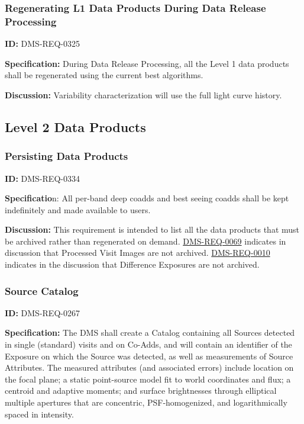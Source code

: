 \documentclass[SE,toc,lsstdraft]{lsstdoc}
\begin{document}
\subsubsection{Regenerating L1 Data Products During Data Release Processing}

\label{DMS-REQ-0325}
\textbf{ID:} DMS-REQ-0325

\textbf{Specification:} During Data Release Processing, all the Level 1 data products shall be regenerated using the current best algorithms.

\textbf{Discussion:} Variability characterization will use the full light curve history.




\subsection{Level 2 Data Products}





\subsubsection{Persisting Data Products}

\label{DMS-REQ-0334}
\textbf{ID:} DMS-REQ-0334



\textbf{Specificatio}n: All per-band deep coadds and best seeing coadds shall be kept indefinitely and made available to users.

\textbf{Discussion:} This requirement is intended to list all the data products that must be archived rather than regenerated on demand. \hyperref[DMS-REQ-0069]{DMS-REQ-0069} indicates in discussion that Processed Visit Images are not archived. \hyperref[DMS-REQ-0010]{DMS-REQ-0010} indicates in the discussion that Difference Exposures are not archived.




\subsubsection{Source Catalog}

\label{DMS-REQ-0267}
\textbf{ID:} DMS-REQ-0267

\textbf{Specification:} The DMS shall create a Catalog containing all Sources detected in single (standard) visits and on Co-Adds, and will contain an identifier of the Exposure on which the Source was detected, as well as measurements of Source Attributes. The measured attributes (and associated errors) include location on the focal plane; a static point-source model fit to world coordinates and flux; a centroid and adaptive moments; and surface brightnesses through elliptical multiple apertures that are concentric, PSF-homogenized, and logarithmically spaced in intensity.
\end{document}
